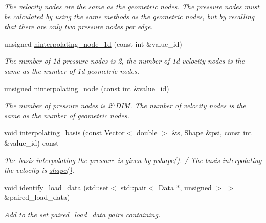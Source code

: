 \begin{DoxyCompactItemize}
\begin{DoxyCompactList}\small\item\em The velocity nodes are the same as the geometric nodes. The pressure nodes must be calculated by using the same methods as the geometric nodes, but by recalling that there are only two pressure nodes per edge. \end{DoxyCompactList}\item 
unsigned \hyperlink{classoomph_1_1RefineableGeneralisedNewtonianQTaylorHoodElement_accecb785cec4dd63c6e4b1804c1697a5}{ninterpolating\+\_\+node\+\_\+1d} (const int \&value\+\_\+id)
\begin{DoxyCompactList}\small\item\em The number of 1d pressure nodes is 2, the number of 1d velocity nodes is the same as the number of 1d geometric nodes. \end{DoxyCompactList}\item 
unsigned \hyperlink{classoomph_1_1RefineableGeneralisedNewtonianQTaylorHoodElement_a074d030db713c63e1077446d0bab5c1a}{ninterpolating\+\_\+node} (const int \&value\+\_\+id)
\begin{DoxyCompactList}\small\item\em The number of pressure nodes is 2$^\wedge$\+D\+IM. The number of velocity nodes is the same as the number of geometric nodes. \end{DoxyCompactList}\item 
void \hyperlink{classoomph_1_1RefineableGeneralisedNewtonianQTaylorHoodElement_ae0ff45825430e85d615efd287f4a5d6b}{interpolating\+\_\+basis} (const \hyperlink{classoomph_1_1Vector}{Vector}$<$ double $>$ \&\hyperlink{cfortran_8h_ab7123126e4885ef647dd9c6e3807a21c}{s}, \hyperlink{classoomph_1_1Shape}{Shape} \&psi, const int \&value\+\_\+id) const
\begin{DoxyCompactList}\small\item\em The basis interpolating the pressure is given by pshape(). / The basis interpolating the velocity is \hyperlink{classoomph_1_1FiniteElement_a58a25b6859ddd43b7bfe64a19fee5023}{shape()}. \end{DoxyCompactList}\item 
void \hyperlink{classoomph_1_1RefineableGeneralisedNewtonianQTaylorHoodElement_a1ac7edfbc1114f039d4ed73ad9234be3}{identify\+\_\+load\+\_\+data} (std\+::set$<$ std\+::pair$<$ \hyperlink{classoomph_1_1Data}{Data} $\ast$, unsigned $>$ $>$ \&paired\+\_\+load\+\_\+data)
\begin{DoxyCompactList}\small\item\em Add to the set {\ttfamily paired\+\_\+load\+\_\+data} pairs containing. \end{DoxyCompactList}\end{DoxyCompactItemize}
